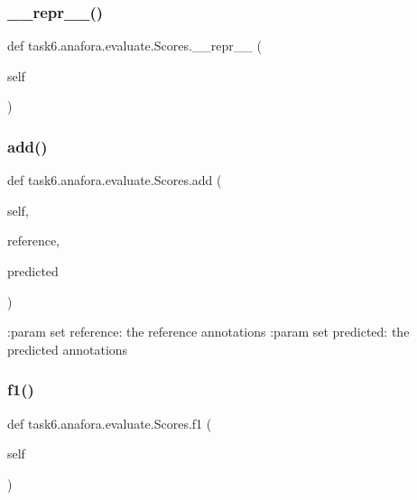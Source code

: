 \subsubsection{\texorpdfstring{\+\_\+\+\_\+repr\+\_\+\+\_\+()}{\_\_repr\_\_()}}
{\footnotesize\ttfamily def task6.\+anafora.\+evaluate.\+Scores.\+\_\+\+\_\+repr\+\_\+\+\_\+ (\begin{DoxyParamCaption}\item[{}]{self }\end{DoxyParamCaption})}

\mbox{\label{classtask6_1_1anafora_1_1evaluate_1_1Scores_ac99fe62b32b6558f53ee4ae78d48173c}} 
\subsubsection{\texorpdfstring{add()}{add()}}
{\footnotesize\ttfamily def task6.\+anafora.\+evaluate.\+Scores.\+add (\begin{DoxyParamCaption}\item[{}]{self,  }\item[{}]{reference,  }\item[{}]{predicted }\end{DoxyParamCaption})}

\begin{DoxyVerb}:param set reference: the reference annotations
:param set predicted: the predicted annotations
\end{DoxyVerb}
 \mbox{\label{classtask6_1_1anafora_1_1evaluate_1_1Scores_abec93b5c96360088bd44b83d71a48a0f}} 
\subsubsection{\texorpdfstring{f1()}{f1()}}
{\footnotesize\ttfamily def task6.\+anafora.\+evaluate.\+Scores.\+f1 (\begin{DoxyParamCaption}\item[{}]{self }\end{DoxyParamCaption})}

